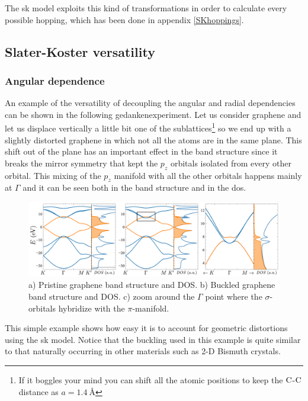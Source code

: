 The \ac{sk} model exploits this kind of transformations in order to calculate every possible hopping, which has been done in appendix \ref{SKhoppings}.


\subsection{Slater-Koster versatility}


\subsubsection{Angular dependence}
An example of the versatility of decoupling the angular and radial dependencies can be shown in the following gedankenexperiment. Let us consider graphene and let us displace vertically a little bit one of the sublattices\footnote{If it boggles your mind you can shift all the atomic positions to keep the $\ce{C}$-$\ce{C}$ distance as $a=\SI{1.4}{\angstrom}$}
so we end up with a slightly distorted graphene in which not all the atoms are in the same plane. This shift out of the plane has an important effect in the band structure since it breaks the mirror symmetry that kept the $p_z$ orbitals isolated from every other orbital.
This mixing of the $p_z$ manifold with all the other orbitals happens mainly at $\Gamma$ and it can be seen both in the band structure and in the \ac{dos}.
\begin{figure}[!ht]
\centering
\includegraphics{graphene/figures/banddos_G_buck.pdf}
\vspace{-5pt}
\caption{a) Pristine graphene band structure and DOS. b) Buckled graphene band structure and DOS. c) zoom around the $\Gamma$ point where the $\sigma$-orbitals hybridize with the $\pi$-manifold.}
\label{fig:buckling}
\end{figure}
\FloatBarrier
This simple example shows how easy it is to account for geometric distortions using the \ac{sk} model. Notice that the buckling used in this example is quite similar to that naturally occurring in other materials such as 2-D Bismuth crystals.

